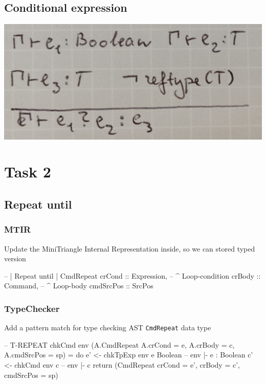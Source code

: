 \documentclass{article}
\begin{document}
\subsection{Conditional expression}

\begin{center}
  \includegraphics[scale=0.1]{conditional_type.jpg}
\end{center}


\section{Task 2}

\subsection{Repeat until}

\subsubsection{MTIR}

\begin{flushleft}
Update the MiniTriangle Internal Representation inside, so we can stored typed version
\end{flushleft}
\begin{code}
    -- | Repeat until
    | CmdRepeat {
          crCond    :: Expression,      -- ^ Loop-condition
          crBody    :: Command,         -- ^ Loop-body
          cmdSrcPos :: SrcPos
      }
\end{code}

\subsubsection{TypeChecker}
\begin{flushleft}
Add a pattern match for type checking AST \texttt{CmdRepeat} data type
\end{flushleft}
\begin{code}
-- T-REPEAT
chkCmd env (A.CmdRepeat {A.crCond = e, A.crBody = c, A.cmdSrcPos = sp}) = do
    e' <- chkTpExp env e Boolean                        -- env |- e : Boolean
    c' <- chkCmd env c                                  -- env |- c
    return (CmdRepeat {crCond = e', crBody = c', cmdSrcPos = sp})
\end{code}
\end{document}
